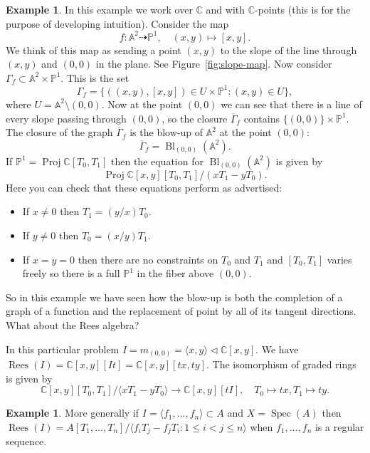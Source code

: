 \documentclass[12pt]{article}
\numberwithin{equation}{section}
\theoremstyle{definition}
\newtheorem{example}[theorem]{Example}
\theoremstyle{remark}
\newcommand{\CC}{\mathbb{C}}
\newcommand{\PP}{\mathbb{P}}
\renewcommand{\AA}{\mathbb{A}}
\newcommand{\Spec}{\operatorname{Spec}}
\newcommand{\Proj}{\operatorname{Proj}}
\newcommand{\Bl}{\operatorname{Bl}}
\newcommand{\Rees}{\operatorname{Rees}}
\begin{document}
\begin{example}
	In this example we work over $\CC$ and with $\CC$-points (this is for the purpose of developing intuition). 
	Consider the map 
	$$f: \AA^2\dashrightarrow \PP^1, \quad (x,y) \mapsto [x,y]. $$
	We think of this map as sending a point $(x,y)$ to the slope of the line through $(x,y)$ and $(0,0)$ in the plane. See Figure~\ref{fig:slope-map}.
	Now consider $ \Gamma_f \subset \AA^2 \times \PP^1.$
	This is the set 
	 $$ \Gamma_f = \lbrace ( (x,y), [x,y]) \in U \times \PP^1 \colon (x,y) \in U \rbrace,$$
	 where $U = \AA^2 \setminus (0,0)$.
	 Now at the point $(0,0)$ we can see that there is a line of every slope passing through $(0,0)$, so the closure $\overline{\Gamma}_f$ contains $\lbrace (0,0) \rbrace\times \PP^1$.
	 The closure of the graph $\overline{\Gamma}_f$ is the blow-up of $\AA^2$ at the point $(0,0)$:
	  $$ \overline{\Gamma}_f = \Bl_{(0,0)}(\AA^2).$$
	  If $\PP^1 = \Proj \CC[T_0,T_1]$ then the equation for $\Bl_{(0,0)}(\AA^2)$ is given by 
	   $$ \Proj \CC[x,y][T_0,T_1]/(xT_1-yT_0). $$
	  Here you can check that these equations perform as advertised:
	  \begin{itemize}
	  	\item If $x\neq 0$ then $T_1 =  (y/x)T_0$. 
	  	\item If $y\neq 0$ then $T_0 = (x/y) T_1$. 
	  	\item If $x=y=0$ then there are no constraints on $T_0$ and $T_1$ and $[T_0,T_1]$ varies freely so there is a full $\PP^1$ in the fiber above $(0,0)$. 
	  \end{itemize}
  	 So in this example we have seen how the blow-up is both the completion of a graph of a function and the replacement of point by all of its tangent directions. What about the Rees algebra?
  	 
  	 In this particular problem $I = m_{(0,0)} = \langle x, y \rangle \vartriangleleft \CC[x,y]$. 
  	 We have $\Rees(I) = \CC[x,y][It] = \CC[x,y][tx,ty]$.
  	 The isomorphism of graded rings is given by
  	 $$\CC[x,y][T_0,T_1]/\langle xT_1-yT_0\rangle \to \CC[x,y][tI], \quad T_0\mapsto tx, T_1 \mapsto ty.$$
\end{example}

\begin{example}
	More generally if $I=\langle f_1,\ldots,f_n\rangle \subset A$ and $X= \Spec(A)$ then 
	 $ \Rees(I) = A[T_1,\ldots,T_n]/\langle f_i T_j - f_j T_i \colon 1\leq i< j \leq n \rangle $ when $f_1,\ldots,f_n$ is a regular sequence.
\end{example}
\end{document}
